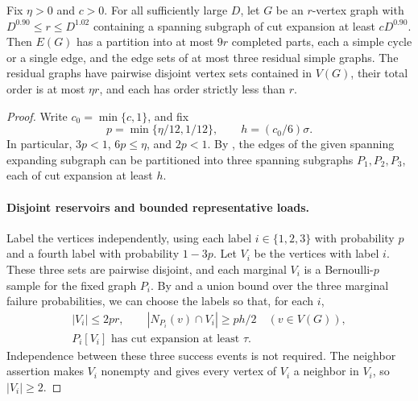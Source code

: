 \begin{lemma}\label{lem:small-residue}
Fix $\eta>0$ and $c>0$.  For all sufficiently large $D$, let $G$ be
an $r$-vertex graph with
$D^{0.90}\le r\le D^{1.02}$ containing a spanning subgraph of cut
expansion at least $cD^{0.90}$.  Then $E(G)$ has a partition into at
most $9r$ completed parts, each a simple cycle or a single edge,
and the edge sets of at most three residual simple graphs.  The
residual graphs have pairwise disjoint vertex sets contained in
$V(G)$, their total order is at most $\eta r$, and each has order
strictly less than $r$.
\end{lemma}

\begin{proof}
Write $c_0=\min\{c,1\}$, and fix
\[
  p=\min\{\eta/12,1/12\},\qquad
  h=(c_0/6)\sigma.
\]
In particular, $3p<1$, $6p\le\eta$, and $2p<1$.
By , the edges of the given spanning expanding
subgraph can be partitioned into three spanning subgraphs
$P_1,P_2,P_3$, each of cut expansion at least $h$.

\paragraph{Disjoint reservoirs and bounded representative loads.}
Label the vertices independently, using each label $i\in\{1,2,3\}$
with probability $p$ and a fourth label with probability $1-3p$.
Let $V_i$ be the vertices with label $i$.  These three sets are
pairwise disjoint, and each marginal $V_i$ is a Bernoulli-$p$
sample for the fixed graph $P_i$.  By 
and a union bound over the three marginal failure probabilities,
we can choose the labels so that, for each $i$,
\begin{equation}\label{eq:residue-three-reservoirs}
\begin{gathered}
  |V_i|\le2pr,\qquad
  |N_{P_i}(v)\cap V_i|\ge ph/2\quad(v\in V(G)),\\
  P_i[V_i]\text{ has cut expansion at least }\tau.
\end{gathered}
\end{equation}
Independence between these three success events is not required.
The neighbor assertion makes $V_i$ nonempty and gives every vertex
of $V_i$ a neighbor in $V_i$, so $|V_i|\ge2$.


\end{proof}
